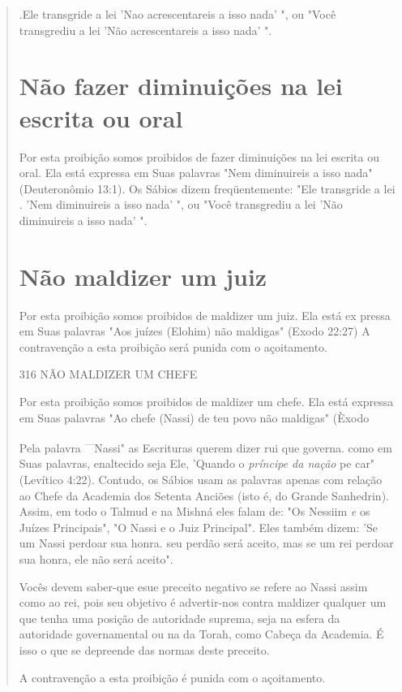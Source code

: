 \begin{quote}
.Ele transgride a lei 'Nao acrescentareis a isso nada'
", ou "Você transgrediu a lei 'Não acrescentareis a isso nada' ".

\section{Não fazer diminuições na lei escrita ou oral}

Por esta proibição somos proibidos de fazer diminuições na lei es­crita
ou oral. Ela está expressa em Suas palavras "Nem diminuireis a isso
nada" (Deuteronômio 13:1). Os Sábios dizem freqüentemente: "Ele
transgride a lei . 'Nem diminuireis a isso nada' ", ou "Você transgrediu
a lei 'Não diminuireis a isso nada' ".

\section{Não maldizer um juiz}

Por esta proibição somos proibidos de maldizer um juiz. Ela está ex
pressa em Suas palavras "Aos juízes (Elohim) não maldigas" (Exodo 22:27)
A contravenção a esta proibição será punida com o açoitamento.

316 NÃO MALDIZER UM CHEFE

Por esta proibição somos proibidos de maldizer um chefe. Ela está
expressa em Suas palavras "Ao chefe (Nassi) de teu povo não maldigas"
(Èxodo

Pela palavra \textsuperscript{---}Nassi" as Escrituras querem dizer rui
que governa. como em Suas palavras, enaltecido seja Ele, 'Quando o
\emph{príncipe da nação} pe car" (Levítico 4:22). Contudo, os Sábios
usam as palavras apenas com relação ao Chefe da Academia dos Setenta
Anciões (isto é, do Grande Sanhedrin). As­sim, em todo o Talmud e na
Mishná eles falam de: "Os Nessiim \emph{e} os Juízes Prin­cipais", "O
Nassi e o Juiz Principal". Eles também dizem: 'Se um Nassi per­doar sua
honra. seu perdão será aceito, mas se um rei perdoar sua honra, ele não
será aceito".

Vocês devem saber-que esue preceito negativo se refere ao Nassi as­sim
como ao rei, pois seu objetivo é advertir-nos contra maldizer qualquer
um que tenha uma posição de autoridade suprema, seja na esfera da
autoridade go­vernamental ou na da Torah, como Cabeça da Academia. É
isso o que se de­preende das normas deste preceito.

A contravenção a esta proibição é punida com o açoitamento.


\end{quote}
